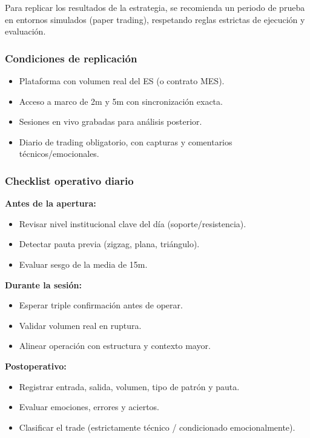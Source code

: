 Para replicar los resultados de la estrategia, se recomienda un periodo de prueba en entornos simulados (paper trading), respetando reglas estrictas de ejecuci\'on y evaluaci\'on.

\subsubsection*{Condiciones de replicaci\'on}

\begin{itemize}
    \sloppy
    \item Plataforma con volumen real del ES (o contrato MES).
    \item Acceso a marco de 2m y 5m con sincronizaci\'on exacta.
    \item Sesiones en vivo grabadas para an\'alisis posterior.
    \item Diario de trading obligatorio, con capturas y comentarios t\'ecnicos/emocionales.
\end{itemize}

\subsubsection*{Checklist operativo diario}

\textbf{Antes de la apertura:}
\begin{itemize}
    \item Revisar nivel institucional clave del d\'ia (soporte/resistencia).
    \item Detectar pauta previa (zigzag, plana, tri\'angulo).
    \item Evaluar sesgo de la media de 15m.
\end{itemize}

\textbf{Durante la sesi\'on:}
\begin{itemize}
    \item Esperar triple confirmaci\'on antes de operar.
    \item Validar volumen real en ruptura.
    \item Alinear operaci\'on con estructura y contexto mayor.
\end{itemize}

\textbf{Postoperativo:}
\begin{itemize}
    \item Registrar entrada, salida, volumen, tipo de patr\'on y pauta.
    \item Evaluar emociones, errores y aciertos.
    \item Clasificar el trade (estrictamente t\'ecnico / condicionado emocionalmente).
\end{itemize}

